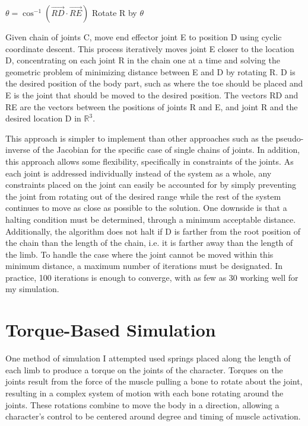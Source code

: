 \begin{algorithm}[ht]
	\centering
	\begin{algorithmic}[H]
		\Repeat
			\State $\theta = \cos^{-1} \left(\vec{RD} \cdot \vec{RE}\right)$
			\State Rotate R by $\theta$
		\EndFor
		\EndFunction
	\end{algorithmic}
	\caption[Single chain IK algorithm]{Given chain of joints C, move end effector joint E to position D using cyclic coordinate descent.  This process iteratively moves joint E closer to the location D, concentrating on each joint R in the chain one at a time and solving the geometric problem of minimizing distance between E and D by rotating R.  D is the desired position of the body part, such as where the toe should be placed and E is the joint that should be moved to the desired position.  The vectors RD and RE are the vectors between the positions of joints R and E, and joint R and the desired location D in $\mathbb{R}^3$.}
	\label{alg:ik}
\end{algorithm}


This approach is simpler to implement than other approaches such as the pseudo-inverse of the Jacobian for the specific case of single chains of joints.  In addition, this approach allows some flexibility, specifically in constraints of the joints.  As each joint is addressed individually instead of the system as a whole, any constraints placed on the joint can easily be accounted for by simply preventing the joint from rotating out of the desired range while the rest of the system continues to move as close as possible to the solution.  One downside is that a halting condition must be determined, through a minimum acceptable distance.  Additionally, the algorithm does not halt if D is farther from the root position of the chain than the length of the chain, i.e. it is farther away than the length of the limb.  To handle the case where the joint cannot be moved within this minimum distance, a maximum number of iterations must be designated.  In practice, 100 iterations is enough to converge, with as few as 30 working well for my simulation.

\section{Torque-Based Simulation}
\label{section:torque}
One method of simulation I attempted used springs placed along the length of each limb to produce a torque on the joints of the character.  Torques on the joints result from the force of the muscle pulling a bone to rotate about the joint, resulting in a complex system of motion with each bone rotating around the joints.  These rotations combine to move the body in a direction, allowing a character's control to be centered around degree and timing of muscle activation. 

